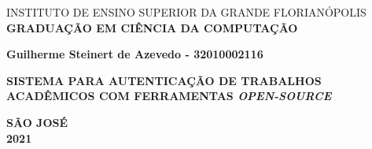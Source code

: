 \newcommand{\seniorThesisTitle}{Sistema para autenticação de trabalhos acadêmicos com ferramentas \textit{open-source}}
\begin{center}
    \uppercase{instituto de ensino superior da grande florianópolis}
    \textbf{\uppercase{graduação em ciência da computação}}
    
    \vspace*{2cm}
            
   \textbf{Guilherme Steinert de Azevedo - 32010002116}
    
    \vspace*{3.5cm}

    \textbf{\uppercase{\seniorThesisTitle}}
    \vfill
        
    {\large \bfseries \uppercase{São José \\ 2021}}
\end{center}
\newpage
